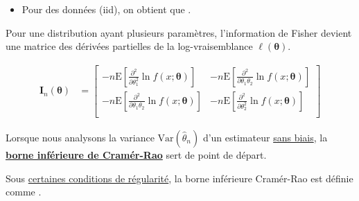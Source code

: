 \documentclass[10pt, french]{article}
\begin{document}
\begin{multicols*}{2}
\begin{definitionNOHFILL}
\begin{itemize}
	\item	Pour des données (iid), on obtient que .
\end{itemize}
\end{definitionNOHFILL}


\begin{definitionNOHFILL}
Pour une distribution ayant plusieurs paramètres, l'information de Fisher devient une matrice des dérivées partielles de la log-vraisemblance $\ell(\bm{\theta})$.

\begin{definitionNOHFILLsub}[Matrice d'information (de Fisher) pour $\bm{\theta} = (\theta_{1}, \theta_{2})$]
\begin{align*}
	\bm{I}_{n}(\bm{\theta})
	&=	\begin{bmatrix}
		-n\text{E}\left[\frac{\partial^{2}}{\partial\theta_{1}^{2}} \ln f(x; \bm{\theta})\right]	&	-n\text{E}\left[\frac{\partial^{2}}{\partial\theta_{1}\theta_{2}} \ln f(x; \bm{\theta})\right]	\\
		-n\text{E}\left[\frac{\partial^{2}}{\partial\theta_{1}\theta_{2}} \ln f(x; \bm{\theta})\right]	&	-n\text{E}\left[\frac{\partial^{2}}{\partial\theta_{2}^{2}} \ln f(x; \bm{\theta})\right]	\\
		\end{bmatrix}
\end{align*}
\end{definitionNOHFILLsub}
\end{definitionNOHFILL}


\begin{definitionNOHFILL}
\begin{rappel_enhanced}[Motivation]
Lorsque nous analysons la variance $\text{Var}(\hat{\theta}_{n})$ d'un estimateur \underline{sans biais}, la \hyperlink{cramer-rao}{\textbf{borne inférieure de Cramér-Rao}} sert de point de départ. 
\end{rappel_enhanced}

Sous \hyperlink{reg_cond}{\color{blue!40!green!80!black}certaines conditions de régularité}, la borne inférieure Cramér-Rao est définie comme .

\tcbline


\end{definitionNOHFILL}
\end{multicols*}
\end{document}
